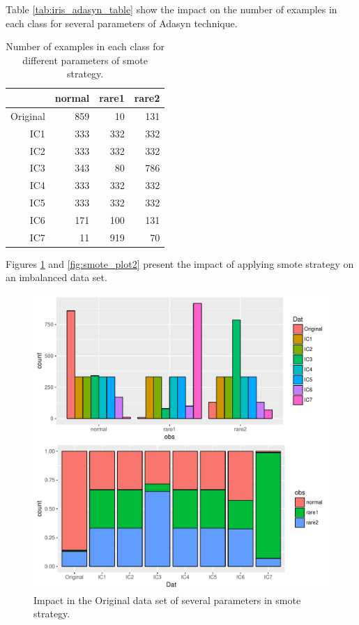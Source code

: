 \documentclass[10pt,a4paper]{article}\usepackage[]{graphicx}\usepackage[]{color}
\makeatletter
\def\maxwidth{ %
  \ifdim\Gin@nat@width>\linewidth
    \linewidth
  \else
    \Gin@nat@width
  \fi
}
\newenvironment{knitrout}{}{} %
\makeatother
\begin{document}
Table \ref{tab:iris_adasyn_table} show the impact on the number of examples in each class for several parameters of Adasyn technique.

\begin{table}[ht]
\centering
\begin{tabular}{rrrr}
  \hline
 & normal & rare1 & rare2 \\ 
  \hline
Original & 859 &  10 & 131 \\ 
  IC1 & 333 & 332 & 332 \\ 
  IC2 & 333 & 332 & 332 \\ 
  IC3 & 343 &  80 & 786 \\ 
  IC4 & 333 & 332 & 332 \\ 
  IC5 & 333 & 332 & 332 \\ 
  IC6 & 171 & 100 & 131 \\ 
  IC7 &  11 & 919 &  70 \\ 
   \hline
\end{tabular}
\caption{Number of examples in each class for different parameters of smote strategy.} 
\label{tab:iris_smote_table}
\end{table}


Figures \ref{fig:smote_plot_hist2} and \ref{fig:smote_plot2} present the impact of applying smote strategy on an imbalanced data set.

\begin{knitrout}\footnotesize
{}\color{fgcolor}\begin{figure}

{\centering \includegraphics[width=\maxwidth,height=0.5\textheight]{figures/UBL-smote_plot_hist2-1} 

}

\caption[Impact in the Original data set of several parameters in smote strategy]{Impact in the Original data set of several parameters in smote strategy. }\label{fig:smote_plot_hist2}
\end{figure}


\end{knitrout}
\end{document}
